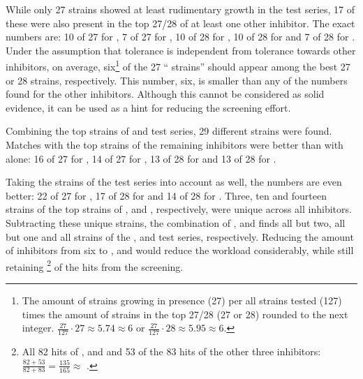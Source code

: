 While only 27 strains showed at least rudimentary growth in the \van{} test series, 17 of these were also present in the top 27/28 of at least one other inhibitor. The exact numbers are: 10 of 27 for \fur{}, 7 of 27 for \hmf{}, 10 of 28 for \fora{}, 10 of 28 for \acet{} and 7 of 28 for \laev{}. Under the assumption that \van{} tolerance is independent from tolerance towards other inhibitors, on average, six\footnote{The amount of strains growing in \van{} presence (27) per all strains tested (127) times the amount of strains in the top 27/28 (27 or 28) rounded to the next integer.
$\frac{27}{127} \cdot 27 \approx 5.74 \approx 6$ or 
$\frac{27}{127} \cdot 28 \approx 5.95 \approx 6$.}
 of the 27 \enquote{\van{} strains} should appear among the best 27 or 28 strains, respectively. This number, six, is smaller than any of the numbers found for the other inhibitors. Although this cannot be considered as solid evidence, it can be used as a hint for reducing the screening effort.

Combining the top strains of \acet{} and \van{} test series, 29 different strains were found. Matches with the top strains of the remaining inhibitors were better than with \van{} alone: 16 of 27 for \fur{}, 14 of 27 for \hmf{}, 13 of 28 for \fora{} and 13 of 28 for \laev{}.


Taking the strains of the \hmf{} test series into account as well, the numbers are even better: 22 of 27 for \fur{}, 17 of 28 for \fora{} and 14 of 28 for \laev{}. Three, ten and fourteen strains of the top strains of \fur{}, \fora{} and \laev{}, respectively, were unique across all inhibitors. Subtracting these unique strains, the combination of \acet{}, \van{} and \hmf{} finds all but two, all but one and all strains of the \fur{}, \fora{} and \laev{} test series, respectively. Reducing the amount of inhibitors from six to \acet{}, \van{} and \hmf{} would reduce the workload considerably, while still retaining \footnote{All 82 hits of \acet{}, \van{} and \hmf{} and 53 of the 83 hits of the other three inhibitors: $\frac{82 + 53}{82 + 83} = \frac{135}{165} \approx$ .} of the hits from the screening.

